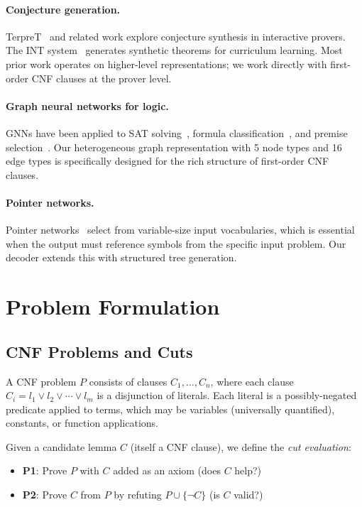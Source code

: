 \documentclass{article}
\begin{document}
\paragraph{Conjecture generation.}
TerpreT~\cite{gauthier2021tactictoe} and related work explore conjecture synthesis
in interactive provers. The INT system~\cite{wu2021int} generates synthetic
theorems for curriculum learning. Most prior work operates on higher-level
representations; we work directly with first-order CNF clauses at the prover level.

\paragraph{Graph neural networks for logic.}
GNNs have been applied to SAT solving~\cite{selsam2019learning}, formula
classification~\cite{crouse2019improving}, and premise selection~\cite{paliwal2020graph}.
Our heterogeneous graph representation with 5 node types and 16 edge types is
specifically designed for the rich structure of first-order CNF clauses.

\paragraph{Pointer networks.}
Pointer networks~\cite{vinyals2015pointer} select from variable-size input
vocabularies, which is essential when the output must reference symbols from
the specific input problem. Our decoder extends this with structured tree generation.

\section{Problem Formulation}
\label{sec:problem}

\subsection{CNF Problems and Cuts}

A CNF problem $P$ consists of clauses $C_1, \ldots, C_n$, where each clause
$C_i = l_1 \lor l_2 \lor \cdots \lor l_m$ is a disjunction of literals. Each literal
is a possibly-negated predicate applied to terms, which may be variables (universally
quantified), constants, or function applications.

Given a candidate lemma $C$ (itself a CNF clause), we define the \emph{cut evaluation}:
\begin{itemize}
\item \textbf{P1}: Prove $P$ with $C$ added as an axiom (does $C$ help?)
\item \textbf{P2}: Prove $C$ from $P$ by refuting $P \cup \{\neg C\}$ (is $C$ valid?)
\end{itemize}
\end{document}
